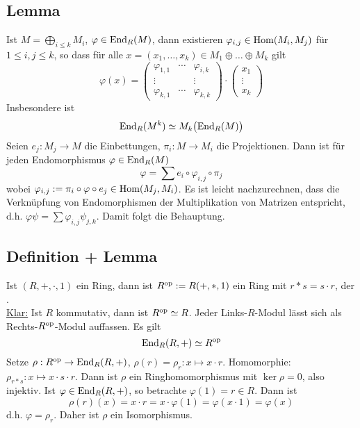 \subsection[Lemma: Darstellung von $\varphi \in \End_R(M)$ als Matrix]{Lemma} %
\label{sub:227}
Ist $M = \bigoplus_{i \le k} M_i$, $\varphi \in \End_R(M)$, dann existieren $\varphi_{i,j} \in \Hom(M_i, M_j)$ für $1 \le i,j \le k$, so dass für alle 
$x = (x_1, \ldots , x_k) \in M_1 \oplus \ldots \oplus M_k$ gilt
\[
	\varphi(x) = \begin{pmatrix}
		\varphi_{1,1} & \cdots & \varphi_{i,k} \\
		\vdots & &\vdots \\
		\varphi_{k,1} & \cdots & \varphi_{k,k}
	\end{pmatrix}\cdot 
	\begin{pmatrix}
		x_1 \\ \vdots \\ x_k
	\end{pmatrix}
\]
Insbesondere ist 
\[
	\End_R(M^k) \simeq M_k \enbrace[\big]{\End_R(M)}
\]
Seien $e_j : M_j \to M$ die Einbettungen, $\pi_i : M \to M_i$ die Projektionen. Dann ist für jeden Endomorphismus $\varphi \in \End_R(M)$
\[
	\varphi = \sum e_i \circ \varphi_{i,j} \circ \pi_j
\]
wobei $\varphi_{i,j} := \pi_i \circ \varphi \circ e_j \in \Hom(M_j, M_i)$.
Es ist leicht nachzurechnen, dass die Verknüpfung von Endomorphismen der Multiplikation von Matrizen entspricht, d.h. $\varphi \psi = \sum \varphi_{i,j} \psi_{j,k}$. Damit
folgt die Behauptung. \bewende

\subsection[Definition: Entgegengesetzter Ring $R^{\op} \simeq \End_R(R,+)$]{Definition + Lemma} %
\label{sub:228}
Ist $(R,+,\cdot ,1)$ ein Ring, dann ist $R^{\op} := R(+, *, 1)$ ein Ring mit $r * s = s \cdot r$, der . \\
\uline{Klar:} Ist $R$ kommutativ, dann ist $R^{\op} \simeq R$. Jeder Links-$R$-Modul lässt sich als Rechts-$R^\op$-Modul auffassen.
Es gilt
\[
	\End_R(R,+) \simeq R^\op
\]
Setze $\rho : R^\op \to \End_R(R,+)$, $\rho(r)= \rho_r : x \mapsto x \cdot r$. Homomorphie: $\rho_{r * s} : x \mapsto x \cdot s \cdot r$. Dann ist $\rho$ ein
Ringhomomorphismus mit $\ker \rho = 0$, also injektiv. Ist $\varphi \in \End_R(R,+)$, so betrachte $\varphi(1)= r \in R$. Dann ist 
\[
	\rho(r)(x) = x \cdot r = x \cdot \varphi(1) = \varphi(x \cdot 1) = \varphi(x)
\]
d.h. $\varphi = \rho_r$. Daher ist $\rho$ ein Isomorphismus. \bewende
{}

